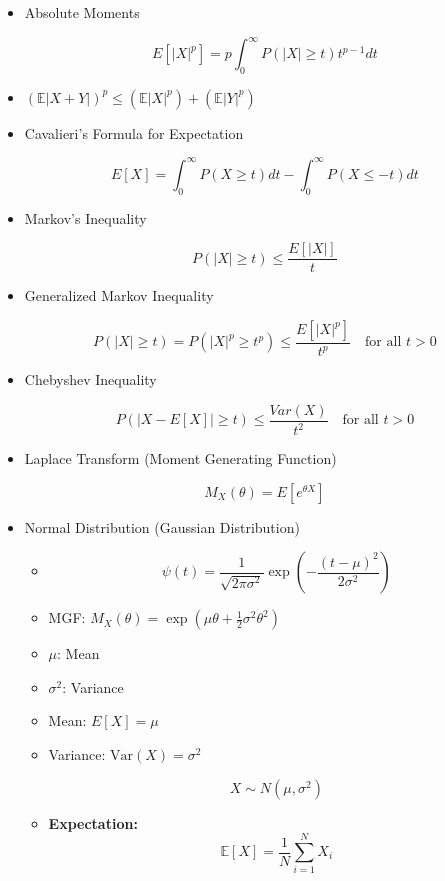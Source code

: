 \documentclass{article}
\begin{document}
\begin{itemize}
\item Absolute Moments

    \[
    E[|X|^p] = p \int_0^{\infty} P(|X| \ge t) t^{p-1} dt
    \]

 \item $\left( \mathbb{E}|X+Y| \right)^{p} \leq \left( \mathbb{E}|X|^{p} \right) + \left( \mathbb{E}|Y|^{p} \right)$

\item Cavalieri's Formula for Expectation

    \[
    E[X] = \int_0^{\infty} P(X \ge t) dt - \int_0^{\infty} P(X \le -t) dt
    \]

\item Markov's Inequality

    \[
    P(|X| \ge t) \le \frac{E[|X|]}{t}
    \]

\item Generalized Markov Inequality

    \[
    P(|X| \ge t) = P(|X|^p \ge t^p) \le \frac{E[|X|^p]}{t^p} \quad \text{for all } t > 0
    \]

\item Chebyshev Inequality

    \[
    P(|X - E[X]| \ge t) \le \frac{Var(X)}{t^2} \quad \text{for all } t > 0
    \]

\item Laplace Transform (Moment Generating Function)

    \[
    M_X(\theta) = E[e^{\theta X}]
    \]

\item Normal Distribution (Gaussian Distribution)

\begin{itemize}
    \item 
  \[
    \psi(t) = \frac{1}{\sqrt{2\pi\sigma^2}} \exp\left(-\frac{(t - \mu)^2}{2\sigma^2}\right)
    \]

     \item MGF: $M_X(\theta) = \exp\left(\mu \theta + \frac{1}{2} \sigma^2 \theta^2\right)$
\item \(\mu\): Mean
\item \(\sigma^2\): Variance
 \item Mean: \(E[X] = \mu\)
        \item Variance: \(\text{Var}(X) = \sigma^2\)

        \[
    X \sim N(\mu, \sigma^2)
    \]

\item \textbf{Expectation:}
\[
\mathbb{E}[X] = \frac{1}{N} \sum_{i=1}^{N} X_i
\]


\end{itemize}
\end{itemize}
\end{document}
